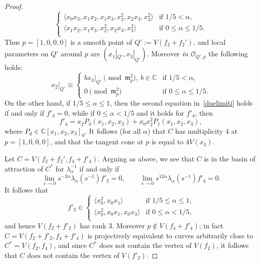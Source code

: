 \documentclass[11pt]{amsart}
\numberwithin{equation}{section}
\theoremstyle{plain}
\theoremstyle{remark}
\theoremstyle{definition}
\newcommand{\CC}{{\mathbb C}}
\newcommand{\cO}{{\mathscr O}}
\newcommand{\gm}{\mathfrak{m}}
\newcommand{\la}{\langle}
\newcommand{\ra}{\rangle}
\begin{document}
\begin{proof}
\begin{equation}
\begin{cases}
%
\la x_0x_3,x_1 x_2,x_1 x_3,x_2^2,x_2 x_3,x_3^2\ra & \text{if $1/5<\alpha$,} \\
%
\la x_1 x_2,x_1 x_3,x_2^2,x_2 x_3,x_3^2\ra & \text{if $0\le\alpha \le 1/5$.} \\
%
\end{cases}
%
\end{equation}
%
Thus  $p=[1,0,0,0]$ is a smooth point of $Q':=V(f_2+f_2')$, and    local parameters on  $Q'$ around $p$ are $(x_1|_{Q'},x_3|_{Q'})$. Moreover  \emph{in $\cO_{Q',p}$} the following holds:
%
\begin{equation}\label{aneloc}
%
x_2|_{Q'}\equiv 
%
\begin{cases}
%
bx_3|_{Q'}\pmod{\gm_p^2},\ b\in\CC & \text{if $1/5<\alpha$,} \\
%
0\pmod{\gm_p^2} & \text{if $0\le\alpha\le 1/5$.}
%
\end{cases}
%
\end{equation}
%
On the other hand, if $1/5\le\alpha\le 1$, then the second equation in~\eqref{duelimiti} holds if and only if $f'_4=0$, while if $0\le\alpha<1/5$ and it holds for $f'_4$, then
%
\begin{equation}\label{rebus}
%
f'_4=x_2 P_3(x_1,x_2,x_3)+x_0 x_2^2 P_1(x_1,x_2,x_3),
%
\end{equation}
 where $P_d\in\CC[x_1,x_2,x_3]_d$. It follows (for all $\alpha$) that $C$ has  multiplicity $4$ at $p=[1,0,0,0]$, and that the tangent cone at $p$ is equal to $4V(x_3)$.  


\medskip

 Let $C=V(f_2+f_2',f_4+f'_4)$. Arguing as above, we see that  $C$ 
is in the basin of attraction  of $C^{*}$ for $\lambda^{-1}_{\alpha}$ if and only if
%
\begin{equation}\label{ancoradue}
%
\lim\limits_{s\to 0}s^{-2\alpha}\lambda_{\alpha}(s^{-1})f'_2=0,\qquad \lim\limits_{s\to 0}s^{12\alpha}\lambda_{\alpha}(s^{-1})f'_4=0.
%
\end{equation}
%
It follows that 
%
\begin{equation}\label{altridue}
%
f'_2\in
%
\begin{cases}
%
\la x^2_0,x_0 x_1\ra & \text{if $1/5\le \alpha\le 1$,} \\
%
\la x^2_0,x_0 x_1, x_0 x_3\ra & \text{if $0\le\alpha < 1/5$,} \\
%
\end{cases}
%
\end{equation}
%
and hence $V(f_2+f'_2)$ has rank $3$. Moreover  $p\notin V(f_4+f'_4)$; in fact $C=V(f_2+f'_2,f_4+f'_4)$ is projectively equivalent to curves arbitrarily close to $C^{*}=V(f_2,f_4)$, and since $C^{*}$ does not contain the vertex of $V(f_2)$, it follows that $C$ does not contain the vertex of $V(f'_2)$.


\end{proof}
\end{document}
